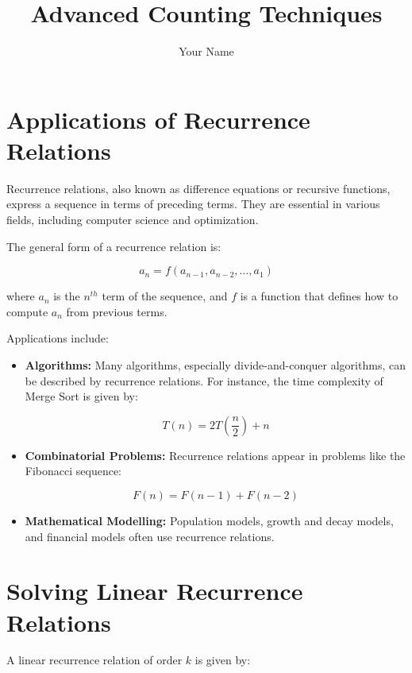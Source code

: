 \documentclass{article}
\begin{document}
    \title{Advanced Counting Techniques}
    \author{Your Name}
    \maketitle

    \section{Applications of Recurrence Relations}
    Recurrence relations, also known as difference equations or recursive functions, express a sequence in terms of preceding terms. They are essential in various fields, including computer science and optimization.

    The general form of a recurrence relation is:

    \begin{equation}
        a_n = f(a_{n-1}, a_{n-2}, \ldots, a_1)
    \end{equation}

    where \(a_n\) is the \(n^{th}\) term of the sequence, and \(f\) is a function that defines how to compute \(a_n\) from previous terms.

    Applications include:

    \begin{itemize}
        \item {\bf Algorithms:} Many algorithms, especially divide-and-conquer algorithms, can be described by recurrence relations. For instance, the time complexity of Merge Sort is given by:

        \begin{equation}
            T(n) = 2T\left(\frac{n}{2}\right) + n
        \end{equation}

        \item {\bf Combinatorial Problems:} Recurrence relations appear in problems like the Fibonacci sequence:

        \begin{equation}
            F(n) = F(n - 1) + F(n - 2)
        \end{equation}

        \item {\bf Mathematical Modelling:} Population models, growth and decay models, and financial models often use recurrence relations.
    \end{itemize}

    \section{Solving Linear Recurrence Relations}
    A linear recurrence relation of order $k$ is given by:
\end{document}
